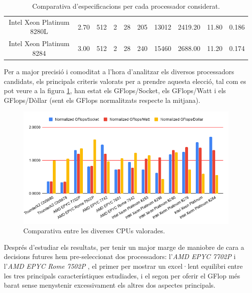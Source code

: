 \begin{table}[H]
{\begin{tabular}{c||c|c|c|c|c|c|c|c|c}
Intel Xeon Platinum 8280L & 2.70       & 512                                                       & 2                                                        & 28    & 205   & 13012      & 2419.20       & 11.80       & 0.186         \\
\rowcolor[HTML]{EFEFEF} 
Intel Xeon Platinum 8284  & 3.00       & 512                                                       & 2                                                        & 28    & 240   & 15460      & 2688.00       & 11.20       & 0.174         \\ \hline 
\end{tabular}
}
    \caption{Comparativa d'especificacions per cada processador considerat.}
    \label{tab:cpu_cmp}
\end{table}

Per a major precisió i comoditat a l'hora d'analitzar els diversos processadors candidats, els principals criteris valorats per a prendre aquesta elecció, tal com es pot veure a la figura \ref{chartCPUs}, han estat els GFlops/Socket, els GFlops/Watt i els GFlops/Dòllar (sent els GFlops normalitzats respecte la mitjana). 

\begin{figure}[H]
    \centering
    \includegraphics[width=\textwidth]{img/chartCPU}
    \caption{Comparativa entre les diverses CPUs valorades.}
    \label{chartCPUs}
\end{figure}

Després d'estudiar els resultats, per tenir un major marge de maniobre de cara a decisions futures hem pre-seleccionat dos processadors: l'\textit{AMD EPYC 7702P} \cite{cpu_amd_7702_buy} i l'\textit{AMD EPYC Rome 7502P} \cite{cpu_amd_7502_buy}, el primer per mostrar un excel·lent equilibri entre les tres principals característiques estudiades, i el segon per oferir el GFlop més barat sense menystenir excessivament els altres dos aspectes principals.
